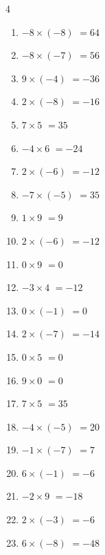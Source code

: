 \begin{multicols}{4}
\begin{enumerate}
  \item $-8\times (-8)$
        $=64$

  \item $-8\times (-7)$
        $=56$

  \item $9\times (-4)$
        $=-36$

  \item $2\times (-8)$
        $=-16$

  \item $7\times 5$
        $=35$

  \item $-4\times 6$
        $=-24$

  \item $2\times (-6)$
        $=-12$

  \item $-7\times (-5)$
        $=35$

  \item $1\times 9$
        $=9$

  \item $2\times (-6)$
        $=-12$

  \item $0\times 9$
        $=0$

  \item $-3\times 4$
        $=-12$

  \item $0\times (-1)$
        $=0$

  \item $2\times (-7)$
        $=-14$

  \item $0\times 5$
        $=0$

  \item $9\times 0$
        $=0$

  \item $7\times 5$
        $=35$

  \item $-4\times (-5)$
        $=20$

  \item $-1\times (-7)$
        $=7$

  \item $6\times (-1)$
        $=-6$

  \item $-2\times 9$
        $=-18$

  \item $2\times (-3)$
        $=-6$

  \item $6\times (-8)$
        $=-48$


\end{enumerate}
\end{multicols}

